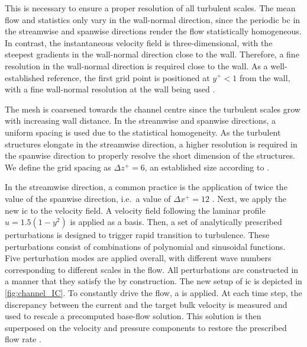 This is necessary to ensure a proper resolution of all turbulent scales.
The mean flow and statistics only vary in the wall-normal direction, since the periodic \acrshort{bc} in the streamwise and spanwise directions render the flow statistically homogeneous.
In contrast, the instantaneous velocity field is three-dimensional, with the steepest gradients in the wall-normal direction close to the wall.
Therefore, a fine resolution in the wall-normal direction is required close to the wall.
As a well-established reference, the first grid point is positioned at $y^+<1$ from the wall, with a fine wall-normal resolution at the wall being used
 \citep{schlatter_assessment_2010}.

The mesh is coarsened towards the channel centre since the turbulent scales grow with increasing wall distance.
In the streamwise and spanwise directions, a uniform spacing is used due to the statistical homogeneity.
As the turbulent structures elongate in the streamwise direction, a higher resolution is required in the spanwise direction to properly resolve the short dimension of the structures.
We define the grid spacing as $\Delta z^+= 6$, an established size according to \citet{pope_turbulent_2015}.

In the streamwise direction, a common practice is the application of twice the value of the spanwise direction, i.e.~a value of $\Delta x^+= 12$ \citep{pope_turbulent_2015}. 
Next, we apply the new \acrshort{ic} to the velocity field.
A velocity field following the laminar profile $u = 1.5(1-y^2)$ is applied as a basis.
Then, a set of analytically prescribed perturbations is designed to trigger rapid transition to turbulence.
These perturbations consist of combinations of polynomial and sinusoidal functions.
Five perturbation modes are applied overall, with different wave numbers corresponding to different scales in the flow.
All perturbations are constructed in a manner that they satisfy the  by construction.
The new setup of \acrshort{ic} is depicted in \autoref{fig:channel_IC}.
To constantly drive the flow, a  is applied.
At each time step, the discrepancy between the current and the target bulk velocity is measured and used to rescale a precomputed base-flow solution.
This solution is then superposed on the velocity and pressure components to restore the prescribed flow rate \citep{jansson_neko_2024}.



